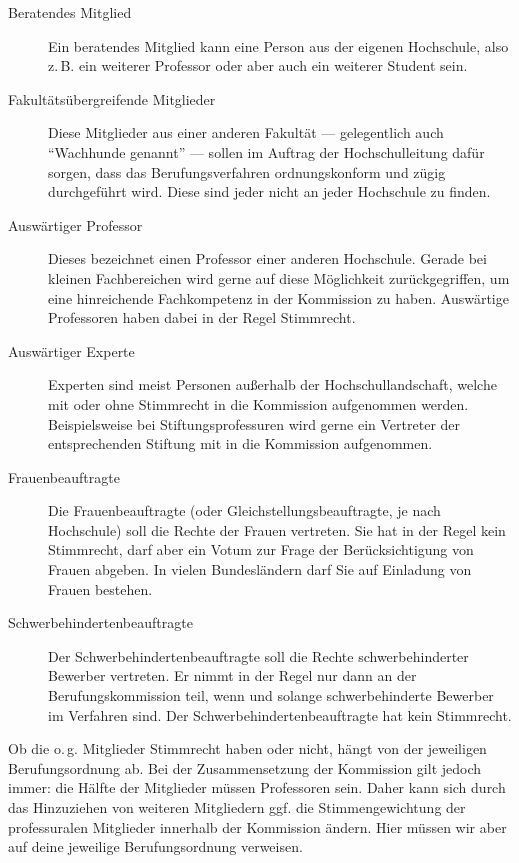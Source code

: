 \begin{description}
    \item [Beratendes Mitglied]
          Ein beratendes Mitglied kann eine Person aus der eigenen Hochschule, also z.\,B. ein weiterer Professor oder aber auch ein weiterer Student sein.

    \item [Fakultätsübergreifende Mitglieder]
          Diese Mitglieder aus einer anderen Fakultät --- gele\-gent\-lich auch "`Wachhunde genannt"' --- sollen im Auftrag der Hochschulleitung dafür sorgen, dass das Berufungsverfahren ordnungskonform und zügig durchgeführt wird. Diese sind jeder nicht an jeder Hochschule zu finden.

    \item [Auswärtiger Professor]
          Dieses bezeichnet einen Professor einer anderen Hochschule. Gerade bei kleinen Fachbereichen wird gerne auf diese Möglichkeit zurückgegriffen, um eine hinreichende Fachkompetenz in der Kommission zu haben. Auswärtige Professoren haben dabei in der Regel Stimmrecht.

    \item [Auswärtiger Experte]
          Experten sind meist Personen außerhalb der Hochschullandschaft, welche mit oder ohne Stimmrecht in die Kommission aufgenommen werden. Beispielsweise bei Stiftungsprofessuren wird gerne ein Vertreter der entsprechenden Stiftung mit in die Kommission aufgenommen.

    \item [Frauenbeauftragte]
          Die Frauenbeauftragte (oder Gleichstellungsbeauftragte, je nach Hochschule) soll die Rechte der Frauen vertreten. Sie hat in der Regel kein Stimmrecht, darf aber ein Votum zur Frage der Berücksichtigung von
          Frauen abgeben. In vielen Bundesländern darf Sie auf Einladung von Frauen bestehen.

    \item [Schwerbehindertenbeauftragte]
          Der Schwerbehindertenbeauftragte soll die Rechte schwerbehinderter Bewerber vertreten. Er nimmt in der
          Regel nur dann an der Berufungskommission teil, wenn und solange schwerbehinderte Bewerber im Verfahren
          sind. Der Schwerbehindertenbeauftragte hat kein Stimmrecht.

\end{description}

Ob die o.\,g. Mitglieder Stimmrecht haben oder nicht, hängt von der jeweiligen Berufungsordnung ab. Bei der Zusammensetzung der Kommission gilt jedoch immer: die Hälfte der Mitglieder müssen Professoren sein. Daher kann sich durch das Hinzuziehen von weiteren Mitgliedern ggf. die Stimmengewichtung der professuralen Mitglieder innerhalb der Kommission ändern. Hier müssen wir aber auf deine jeweilige Berufungsordnung verweisen.

